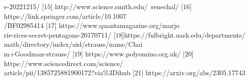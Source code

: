 \begin{multicols}{2}
	e-20221215/
	\vskip 0.1cm
	[$15$] http://www.science.smith.edu/~senechal/
	\vskip 0.1cm
	[$16$] https://link.springer.com/article/10.1007\\
	/BF02985414
	\vskip 0.1cm
	[$17$] https://www.quantamagazine.org/marjo\\
	rie-rices-secret-pentagons-20170711/
	\vskip 0.1cm
	[$18$]https://fulbright.uark.edu/departments/\\
	math/directory/index/uid/strauss/name/Chai\\m+Goodman-strauss/
	\vskip 0.1cm
	[$19$] https://www.polyomino.org.uk/
	\vskip 0.1cm
	[$20$] https://www.sciencedirect.com/science/\\
	article/pii/1385725881900172?via\%3Dihub
	\vskip 0.1cm
	[$21$]
	https://arxiv.org/abs/2305.17743
\end{multicols}